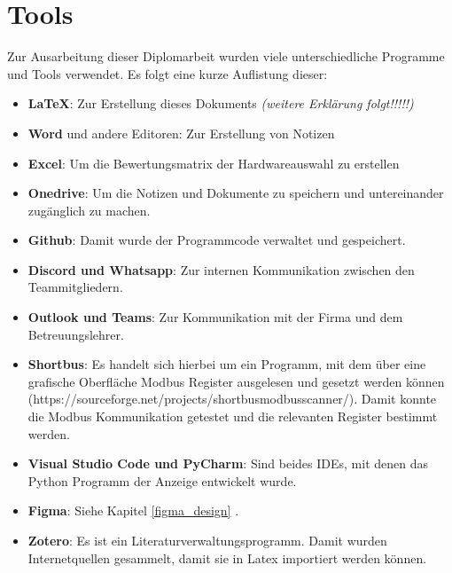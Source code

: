 \ifoot{\leftmark}
\chapter{Tools}
Zur Ausarbeitung dieser Diplomarbeit wurden viele unterschiedliche Programme und Tools verwendet. Es folgt eine kurze Auflistung dieser:
\begin{itemize}
	\item \textbf{\LaTeX}: Zur Erstellung dieses Dokuments \textit{(weitere Erklärung folgt!!!!!)}
	\item \textbf{Word} und andere Editoren: Zur Erstellung von Notizen
	\item \textbf{Excel}: Um die Bewertungsmatrix der Hardwareauswahl zu erstellen
	\item \textbf{Onedrive}: Um die Notizen und Dokumente zu speichern und untereinander zugänglich zu machen.
	\item \textbf{Github}: Damit wurde der Programmcode verwaltet und gespeichert.
	\item \textbf{Discord und Whatsapp}: Zur internen Kommunikation zwischen den Teammitgliedern.
	\item \textbf{Outlook und Teams}: Zur Kommunikation mit der Firma und dem Betreuungslehrer.
	\item \textbf{Shortbus}: Es handelt sich hierbei um ein Programm, mit dem über eine grafische Oberfläche Modbus Register ausgelesen und gesetzt werden können (https://sourceforge.net/projects/shortbusmodbusscanner/). Damit konnte die Modbus Kommunikation getestet und die relevanten Register bestimmt werden.
	\item \textbf{Visual Studio Code und PyCharm}: Sind beides IDEs, mit denen das Python Programm der Anzeige entwickelt wurde.
	\item \textbf{Figma}: Siehe Kapitel \ref{figma_design} .
	\item \textbf{Zotero}: Es ist ein Literaturverwaltungsprogramm. Damit wurden Internetquellen gesammelt, damit sie in Latex importiert werden können.
\end{itemize}
